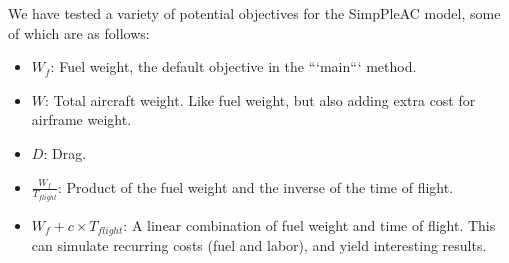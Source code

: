 \documentclass[]{article}
\begin{document}
We have tested a variety of potential objectives for the SimpPleAC
model, some of which are as follows:

\begin{itemize}
    \item $W_f$: Fuel weight, the default objective in the ```main``` method.
    \item $W$: Total aircraft weight. Like fuel weight, but also adding extra cost for airframe weight.
    \item $D$: Drag. 
    \item $\frac{W_f}{T_{flight}}$: Product of the fuel weight and the inverse of the time of flight. 
    \item $W_{f} + c \times T_{flight}$: A linear combination of fuel weight and time of flight. This can simulate recurring costs (fuel and labor), and yield interesting results. 
\end{itemize}
\end{document}
